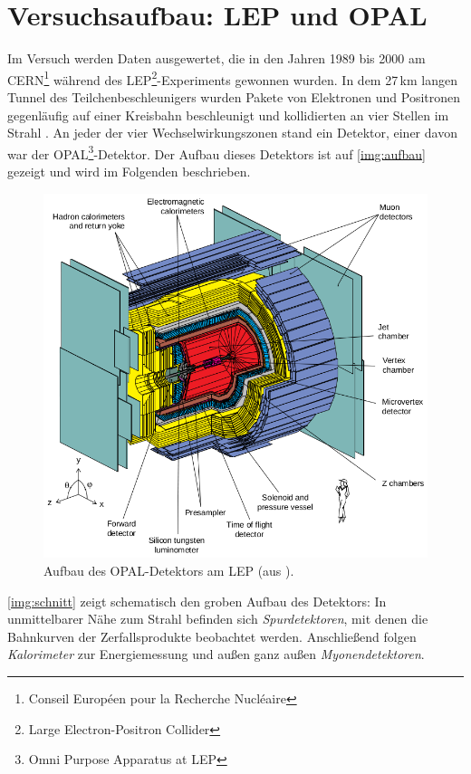 \section{Versuchsaufbau: LEP und OPAL}
Im Versuch werden Daten ausgewertet, die in den Jahren 1989 bis 2000 am
CERN\footnote{Conseil Européen pour la Recherche Nucléaire} während des
LEP\footnote{Large Electron-Positron Collider}-Experiments gewonnen wurden.
In dem 27\,km langen Tunnel des Teilchenbeschleunigers wurden Pakete von 
Elektronen und Positronen gegenläufig auf einer Kreisbahn beschleunigt
und kollidierten an vier Stellen im Strahl \cite{manual}.
An jeder der vier Wechselwirkungszonen stand ein Detektor, einer davon war der
OPAL\footnote{Omni Purpose Apparatus at LEP}-Detektor.
Der Aufbau dieses Detektors ist auf \autoref{img:aufbau} gezeigt und wird im Folgenden beschrieben.

\begin{figure}[H]
\begin{center}
  \includegraphics[width=\textwidth]{../img/aufbau.png}
  \caption{Aufbau des OPAL-Detektors am LEP (aus \cite{manualmuc}).}
  \label{img:aufbau}
\end{center}
\end{figure}

\autoref{img:schnitt} zeigt schematisch den groben Aufbau des Detektors:
In unmittelbarer Nähe zum Strahl befinden sich \emph{Spurdetektoren},
mit denen die Bahnkurven der Zerfallsprodukte beobachtet werden.
Anschließend folgen \emph{Kalorimeter} zur Energiemessung und außen ganz außen \emph{Myonendetektoren}.  

